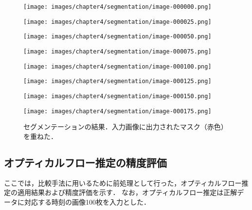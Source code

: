 \begin{figure}[H]
	\centering
	\begin{minipage}[t]{0.4\hsize}
		\centering
		\texttt{[image: images/chapter4/segmentation/image-000000.png]}
		\label{fig:seg000}
	\end{minipage}
	\begin{minipage}[t]{0.4\hsize}
		\centering
		\texttt{[image: images/chapter4/segmentation/image-000025.png]}
		\label{fig:seg025}
	\end{minipage}
	\begin{minipage}[t]{0.4\hsize}
		\centering
		\texttt{[image: images/chapter4/segmentation/image-000050.png]}
		\label{fig:seg050}
	\end{minipage}
	\begin{minipage}[t]{0.4\hsize}
		\centering
		\texttt{[image: images/chapter4/segmentation/image-000075.png]}
		\label{fig:seg075}
	\end{minipage}
	\begin{minipage}[t]{0.4\hsize}
		\centering
		\texttt{[image: images/chapter4/segmentation/image-000100.png]}
		\label{fig:seg100}
	\end{minipage}
	\begin{minipage}[t]{0.4\hsize}
		\centering
		\texttt{[image: images/chapter4/segmentation/image-000125.png]}
		\label{fig:seg125}
	\end{minipage}
	\begin{minipage}[t]{0.4\hsize}
		\centering
		\texttt{[image: images/chapter4/segmentation/image-000150.png]}
		\label{fig:seg150}
	\end{minipage}
	\begin{minipage}[t]{0.4\hsize}
		\centering
		\texttt{[image: images/chapter4/segmentation/image-000175.png]}
		\label{fig:seg175}
	\end{minipage}
	\caption[セグメンテーションの結果]{セグメンテーションの結果．入力画像に出力されたマスク（赤色）を重ねた．}
	\label{fig:segmentaiton_output}
\end{figure}

\subsection{オプティカルフロー推定の精度評価}\label{subsec:opticalflow_eval}
ここでは，比較手法に用いるために前処理として行った，オプティカルフロー推定の適用結果および精度評価を示す．
なお，オプティカルフロー推定は正解データに対応する時刻の画像100枚を入力とした．
